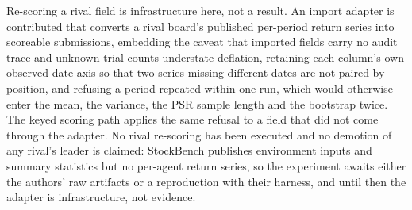 Re-scoring a rival field is infrastructure here, not a result. An import adapter is contributed that converts a rival board's published per-period return series into scoreable submissions, embedding the caveat that imported fields carry no audit trace and unknown trial counts understate deflation, retaining each column's own observed date axis so that two series missing different dates are not paired by position, and refusing a period repeated within one run, which would otherwise enter the mean, the variance, the PSR sample length and the bootstrap twice. The keyed scoring path applies the same refusal to a field that did not come through the adapter. No rival re-scoring has been executed and no demotion of any rival's leader is claimed: StockBench publishes environment inputs and summary statistics but no per-agent return series, so the experiment awaits either the authors' raw artifacts or a reproduction with their harness, and until then the adapter is infrastructure, not evidence.

